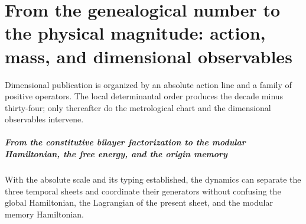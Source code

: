 \chapter{From the genealogical number to the physical magnitude: action, mass, and dimensional observables}
\label{chap:parte-iv-49}

Dimensional publication is organized by an absolute action line and a
family of positive operators. The local determinantal order produces the
decade minus thirty-four; only thereafter do the metrological chart and the
dimensional observables intervene.

\begin{HMTScientificOwnerSubordinated}

\end{HMTScientificOwnerSubordinated}

\begin{HMTScientificOwnerSubordinated}

\end{HMTScientificOwnerSubordinated}



\paragraph{From the constitutive bilayer factorization to the modular Hamiltonian, the free energy, and the origin memory} With the absolute scale and its typing established, the dynamics can separate the three temporal sheets and coordinate their generators without confusing the global Hamiltonian, the Lagrangian of the present sheet, and the modular memory Hamiltonian.
